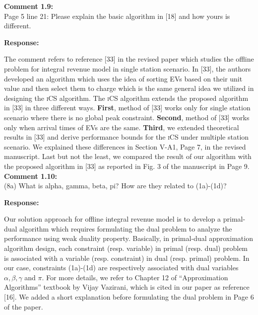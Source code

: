 \documentclass[11pt]{article}
\newcommand{\ics}{\textsc{iCS}\xspace}
\begin{document}
\vspace{5mm}
{
{\color{blue}\noindent\textbf{Comment 1.9:}\\
Page 5 line 21: Please explain the basic algorithm in [18] and how yours is different.
}}

\vspace{5mm}
\noindent\textbf{Response:}

The comment refers to reference [33] in the revised paper which studies the offline problem for integral revenue model in single station scenario. In [33], the authors developed an algorithm which uses the idea of sorting EVs based on their unit value and then select them to charge which is the same general idea we utilized in designing the \ics algorithm. The \ics algorithm extends the proposed algorithm in [33] in three different ways. \textbf{First}, method of [33] works only for single station scenario where there is no global peak constraint. \textbf{Second}, method of [33] works only when arrival times of EVs are the same. \textbf{Third}, we extended theoretical results in [33] and derive performance bounds for the \ics under multiple station scenario. We explained these differences in Section V-A1, Page 7, in the revised manuscript. Last but not the least, we compared the result of our algorithm with the proposed algorithm in [33] as reported in Fig. 3 of the manuscript in Page 9.
\\

\vspace{5mm}
{
{\color{blue}\noindent\textbf{Comment 1.10:}\\
(8a) What is alpha, gamma, beta, pi? How are they related to (1a)-(1d)?
}}

\vspace{5mm}
\noindent\textbf{Response:}

Our solution approach for offline integral revenue model is to develop a primal-dual algorithm which requires formulating the dual problem to analyze the performance using weak duality property. 
Basically, in primal-dual approximation algorithm design, each constraint (resp. variable) in primal (resp. dual) problem is associated with a variable (resp. constraint) in dual (resp. primal) problem. In our case, constraints (1a)-(1d) are respectively associated with dual variables $\alpha, \beta, \gamma$ and $\pi$. For more details, we refer to Chapter 12 of ``Approximation Algorithms'' textbook by Vijay Vazirani, which is cited in our paper as reference [16]. We added a short explanation before formulating the dual problem in Page 6 of the paper. 
\\
\end{document}
